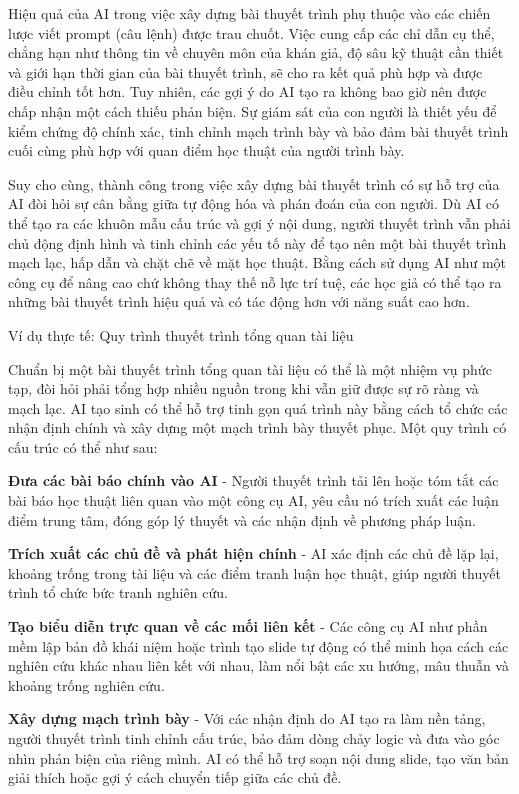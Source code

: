 Hiệu quả của AI trong việc xây dựng bài thuyết trình phụ thuộc vào các chiến lược viết prompt (câu lệnh) được trau chuốt. Việc cung cấp các chỉ dẫn cụ thể, chẳng hạn như thông tin về chuyên môn của khán giả, độ sâu kỹ thuật cần thiết và giới hạn thời gian của bài thuyết trình, sẽ cho ra kết quả phù hợp và được điều chỉnh tốt hơn. Tuy nhiên, các gợi ý do AI tạo ra không bao giờ nên được chấp nhận một cách thiếu phản biện. Sự giám sát của con người là thiết yếu để kiểm chứng độ chính xác, tinh chỉnh mạch trình bày và bảo đảm bài thuyết trình cuối cùng phù hợp với quan điểm học thuật của người trình bày.

Suy cho cùng, thành công trong việc xây dựng bài thuyết trình có sự hỗ trợ của AI đòi hỏi sự cân bằng giữa tự động hóa và phán đoán của con người. Dù AI có thể tạo ra các khuôn mẫu cấu trúc và gợi ý nội dung, người thuyết trình vẫn phải chủ động định hình và tinh chỉnh các yếu tố này để tạo nên một bài thuyết trình mạch lạc, hấp dẫn và chặt chẽ về mặt học thuật. Bằng cách sử dụng AI như một công cụ để nâng cao chứ không thay thế nỗ lực trí tuệ, các học giả có thể tạo ra những bài thuyết trình hiệu quả và có tác động hơn với năng suất cao hơn.

\begin{examplebox}{Ví dụ thực tế: Quy trình thuyết trình tổng quan tài liệu}

Chuẩn bị một bài thuyết trình tổng quan tài liệu có thể là một nhiệm vụ phức tạp, đòi hỏi phải tổng hợp nhiều nguồn trong khi vẫn giữ được sự rõ ràng và mạch lạc. AI tạo sinh có thể hỗ trợ tinh gọn quá trình này bằng cách tổ chức các nhận định chính và xây dựng một mạch trình bày thuyết phục. Một quy trình có cấu trúc có thể như sau:

\textbf{Đưa các bài báo chính vào AI} - Người thuyết trình tải lên hoặc tóm tắt các bài báo học thuật liên quan vào một công cụ AI, yêu cầu nó trích xuất các luận điểm trung tâm, đóng góp lý thuyết và các nhận định về phương pháp luận.

\textbf{Trích xuất các chủ đề và phát hiện chính} - AI xác định các chủ đề lặp lại, khoảng trống trong tài liệu và các điểm tranh luận học thuật, giúp người thuyết trình tổ chức bức tranh nghiên cứu.

\textbf{Tạo biểu diễn trực quan về các mối liên kết} - Các công cụ AI như phần mềm lập bản đồ khái niệm hoặc trình tạo slide tự động có thể minh họa cách các nghiên cứu khác nhau liên kết với nhau, làm nổi bật các xu hướng, mâu thuẫn và khoảng trống nghiên cứu.

\textbf{Xây dựng mạch trình bày} - Với các nhận định do AI tạo ra làm nền tảng, người thuyết trình tinh chỉnh cấu trúc, bảo đảm dòng chảy logic và đưa vào góc nhìn phản biện của riêng mình. AI có thể hỗ trợ soạn nội dung slide, tạo văn bản giải thích hoặc gợi ý cách chuyển tiếp giữa các chủ đề.

\end{examplebox}

